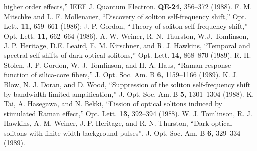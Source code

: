 \begin{references}
higher order effects,'' IEEE J. Quantum Electron. {\bf QE-24,} 356--372
(1988).
F. M. Mitschke and L. F. Mollenauer, ``Discovery of soliton self-frequency
shift,'' Opt. Lett. {\bf 11,} 659--661 (1986);
J. P. Gordon, ``Theory of soliton self-frequency shift,'' Opt. Lett. {\bf
11,} 662--664 (1986).
A. W. Weiner, R. N. Thurston, W.J. Tomlinson, J. P. Heritage, D.E. Leaird,
E. M. Kirschner, and R. J. Hawkins, ``Temporal and spectral self-shifts of
dark optical solitons,''  Opt. Lett. {\bf 14,} 868--870 (1989).
R. H. Stolen, J. P. Gordon, W. J. Tomlinson, and H. A. Haus, ``Raman
response function of silica-core fibers,'' J. Opt. Soc. Am. B {\bf 6,}
1159--1166 (1989).
K. J. Blow, N. J. Doran, and D. Wood, ``Suppression of the soliton
self-frequency shift by bandwidth-limited amplification,''  J. Opt. Soc.
Am. B {\bf 5,} 1301--1304 (1988).
K. Tai, A. Hasegawa, and N. Bekki, ``Fission of optical solitons induced by
stimulated Raman effect,'' Opt. Lett. {\bf 13,} 392--394 (1988).
W. J. Tomlinson, R. J. Hawkins, A. M. Weiner, J. P. Heritage, and R. N.
Thurston, ``Dark optical solitons with finite-width background pulses'', J.
Opt. Soc. Am. B {\bf 6,} 329--334 (1989).
\end{references}




